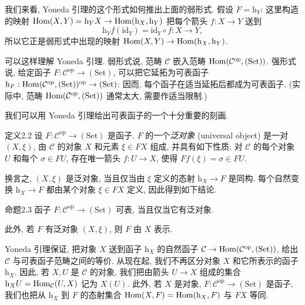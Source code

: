 我们来看, Yoneda 引理的这个形式如何推出上面的弱形式. 假设 $F=\mathrm h_Y$: 这里构造的映射 $\operatorname{Hom}(X,Y)=\mathrm h_YX\to\operatorname{Hom}(\mathrm h_X,\mathrm h_Y)$ 把每个箭头 $f:X\to Y$ 送到
\[
\mathrm h_Yf(\mathrm{id}_Y)=\mathrm{id}_Y\circ f:X\longrightarrow Y,
\]
所以它正是弱形式中出现的映射 $\operatorname{Hom}(X,Y)\to\operatorname{Hom}(\mathrm h_X,\mathrm h_Y)$.

可以这样理解 Yoneda 引理. 弱形式说, 范畴 $\mathcal C$ 嵌入范畴 $\operatorname{Hom}(\mathcal C^{\mathrm{op}},(\mathrm{Set}))$. 强形式说, 给定函子 $F:\mathcal C^{\mathrm{op}}\to(\mathrm{Set})$, 可以把它延拓为可表函子 $\mathrm h_F:\operatorname{Hom}(\mathcal C^{\mathrm{op}},(\mathrm{Set}))^{\mathrm{op}}\to(\mathrm{Set})$: 因而, 每个函子在适当延拓后都成为可表函子. (实际中, 范畴 $\operatorname{Hom}(\mathcal C^{\mathrm{op}},(\mathrm{Set}))$ 通常太大, 需要作适当限制.)

我们可以用 Yoneda 引理给出可表函子的一个十分重要的刻画.

\begin{origstatement}{定义}{2.2}\label{ch02:def22}
设 $F:\mathcal C^{\mathrm{op}}\to(\mathrm{Set})$ 是函子. $F$ 的一个\emph{泛对象} (universal object) 是一对 $(X,\xi)$, 由 $\mathcal C$ 的对象 $X$ 和元素 $\xi\in FX$ 组成, 并具有如下性质: 对 $\mathcal C$ 的每个对象 $U$ 和每个 $\sigma\in FU$, 存在唯一箭头 $f:U\to X$, 使得 $Ff(\xi)=\sigma\in FU$.
\end{origstatement}

换言之, $(X,\xi)$ 是泛对象, 当且仅当由 $\xi$ 定义的态射 $\mathrm h_X\to F$ 是同构. 每个自然变换 $\mathrm h_X\to F$ 都由某个对象 $\xi\in FX$ 定义, 因此得到如下结论.

\begin{origstatement}{命题}{2.3}\label{ch02:prop23}
函子 $F:\mathcal C^{\mathrm{op}}\to(\mathrm{Set})$ 可表, 当且仅当它有泛对象.
\end{origstatement}

此外, 若 $F$ 有泛对象 $(X,\xi)$, 则 $F$ 由 $X$ 表示.

Yoneda 引理保证, 把对象 $X$ 送到函子 $\mathrm h_X$ 的自然函子 $\mathcal C\to\operatorname{Hom}(\mathcal C^{\mathrm{op}},(\mathrm{Set}))$, 给出 $\mathcal C$ 与可表函子范畴之间的等价. 从现在起, 我们不再区分对象 $X$ 和它所表示的函子 $\mathrm h_X$. 因此, 若 $X,U$ 是 $\mathcal C$ 的对象, 我们把由箭头 $U\to X$ 组成的集合 $\mathrm h_XU=\operatorname{Hom}_{\mathcal C}(U,X)$ 记为 $X(U)$. 此外, 若 $X$ 是对象, $F:\mathcal C^{\mathrm{op}}\to(\mathrm{Set})$ 是函子, 我们也把从 $\mathrm h_X$ 到 $F$ 的态射集合 $\operatorname{Hom}(X,F)=\operatorname{Hom}(\mathrm h_X,F)$ 与 $FX$ 等同.


